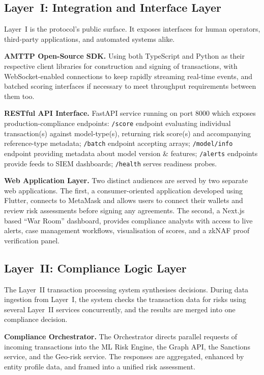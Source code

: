 \documentclass[journal]{IEEEtran}
\begin{document}
\subsection{Layer~I: Integration and Interface Layer}

Layer~I is the protocol's public surface. It exposes interfaces for human operators, third-party applications, and automated systems alike.

\textbf{AMTTP Open-Source SDK.} Using both TypeScript and Python as their respective client libraries for construction and signing of transactions, with WebSocket-enabled connections to keep rapidly streaming real-time events, and batched scoring interfaces if necessary to meet throughput requirements between them too.

\textbf{RESTful API Interface.} FastAPI service running on port 8000 which exposes production-compliance endpoints: \texttt{/score} endpoint evaluating individual transaction(s) against model-type(s), returning risk score(s) and accompanying reference-type metadata; \texttt{/batch} endpoint accepting arrays; \texttt{/model/info} endpoint providing metadata about model version \& features; \texttt{/alerts} endpoints provide feeds to SIEM dashboards; \texttt{/health} serves readiness probes.

\textbf{Web Application Layer.} Two distinct audiences are served by two separate web applications. The first, a consumer-oriented application developed using Flutter, connects to MetaMask and allows users to connect their wallets and review risk assessments before signing any agreements. The second, a Next.js based ``War Room'' dashboard, provides compliance analysts with access to live alerts, case management workflows, visualisation of scores, and a zkNAF proof verification panel.

\subsection{Layer~II: Compliance Logic Layer}

The Layer~II transaction processing system synthesises decisions. During data ingestion from Layer~I, the system checks the transaction data for risks using several Layer~II services concurrently, and the results are merged into one compliance decision.

\textbf{Compliance Orchestrator.} The Orchestrator directs parallel requests of incoming transactions into the ML Risk Engine, the Graph API, the Sanctions service, and the Geo-risk service. The responses are aggregated, enhanced by entity profile data, and framed into a unified risk assessment.
\end{document}
